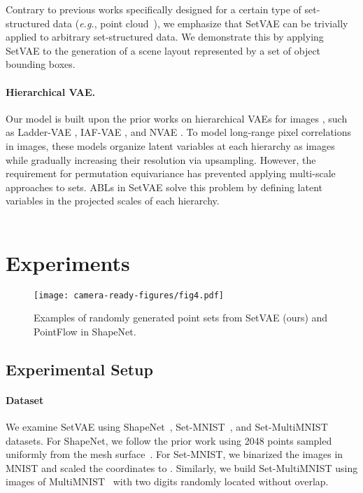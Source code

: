 \documentclass[final]{arxiv/cvpr}
\newcommand{\cutsectionup}{\vspace*{-0.15in}}
\newcommand{\cutparagraphup}{\vspace*{-0.1in}}
\begin{document}
Contrary to previous works specifically designed for a certain type of set-structured data (\emph{e.g.}, point cloud~\cite{achlioptas2018learning, li2018point, yang2019pointflow}), we emphasize that SetVAE can be trivially applied to arbitrary set-structured data. 
We demonstrate this by applying SetVAE to the generation of a scene layout represented by a set of object bounding boxes.



\cutparagraphup
\paragraph{Hierarchical VAE.}
Our model is built upon the prior works on hierarchical VAEs for images \cite{johnson2018structured}, such as Ladder-VAE \cite{sonderby2016ladder}, IAF-VAE \cite{kingma2017improving}, and NVAE \cite{vahdat2020nvae}.
To model long-range pixel correlations in images, these models organize latent variables at each hierarchy as images while gradually increasing their resolution via upsampling.
However, the requirement for permutation equivariance has prevented applying multi-scale approaches to sets.
ABLs in SetVAE solve this problem by defining latent variables in the projected scales of each hierarchy.
\\
\\
 \cutsectionup
\section{Experiments}
\label{sec:experiment}

\begin{figure}[t!]
\centering
    \texttt{[image: camera-ready-figures/fig4.pdf]}
\caption{Examples of randomly generated point sets from SetVAE (ours) and PointFlow in ShapeNet. 
    }
    \label{fig:compare_pointflow}
    \vspace{-0.65cm}
\end{figure}

\subsection{Experimental Setup}
\label{sec:quantitative}

\cutparagraphup
\paragraph{Dataset}
We examine SetVAE using ShapeNet~\cite{chang2015shapenet}, Set-MNIST~\cite{zhang2020deep}, and Set-MultiMNIST~\cite{eslami2016attend} datasets.
For ShapeNet, we follow the prior work using 2048 points sampled uniformly from the mesh surface~\cite{yang2019pointflow}.
For Set-MNIST, we binarized the images in MNIST and scaled the coordinates to  \cite{kosiorek2020conditional}.
Similarly, we build Set-MultiMNIST using  images of MultiMNIST~\cite{eslami2016attend} with two digits randomly located without overlap.
\end{document}
